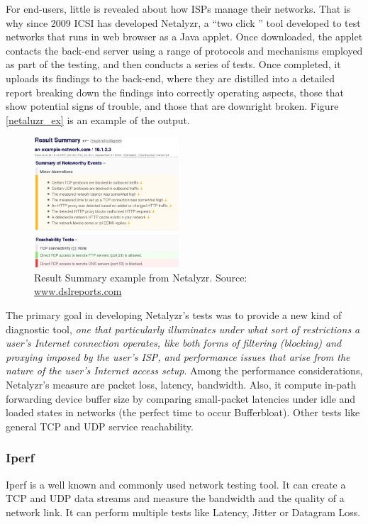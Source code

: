 For end-users, little is revealed about how ISPs manage their networks. That is
why since 2009 ICSI has developed Netalyzr, a ``two click '' tool developed to
test networks that runs in web browser as a Java applet. Once downloaded, the
applet contacts the back-end server using a range of protocols and mechanisms
employed as part of the testing, and then conducts a series of tests. Once
completed, it uploads its findings to the back-end, where they are distilled
into a detailed report breaking down the findings into correctly operating
aspects, those that show potential signs of trouble, and those that are
downright broken. Figure \ref{netaluzr_ex} is an example of the output.\\

\begin{figure}
	\begin{center}
		\includegraphics[width=0.48\textwidth]{img/netalyzr_ex}
	\end{center}
	\caption{Result Summary example from Netalyzr. Source:
	\url{www.dslreports.com}}   
	\label{netalyzr_ex} 
\end{figure}

The primary goal in developing Netalyzr's tests was to provide a new kind of
diagnostic tool, \textit{one that particularly illuminates under what sort of
restrictions a user's Internet connection operates, like both forms of filtering
(blocking) and proxying imposed by the user's ISP, and performance issues that
arise from the nature of the user's Internet access setup}\cite{netalyzr}. Among
the performance considerations, Netalyzr's measure are packet loss, latency,
bandwidth. Also, it compute in-path forwarding device buffer size by comparing
small-packet latencies under idle and loaded states in networks (the perfect
time to occur Bufferbloat). Other tests like general TCP and UDP service
reachability.\\

\subsubsection{Iperf}
Iperf is a well known and commonly used network testing tool. It can create a
TCP and UDP data streams and measure the bandwidth and the quality of a network
link. It can perform multiple tests like Latency, Jitter or Datagram Loss.\\

